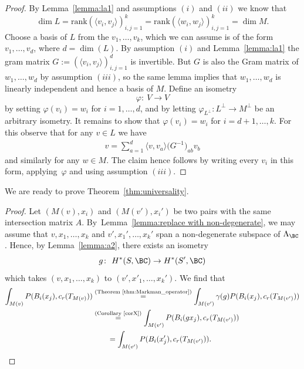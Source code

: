 \begin{proof}
By Lemma~\ref{lemma:la1} and assumptions $(i)$ and $(ii)$ we know that
\[
\dim L = \mathrm{rank} (\langle v_i, v_j \rangle)_{i,j=1}^{k} =
\mathrm{rank} (\langle w_i, w_j \rangle)_{i,j=1}^{k} = \dim M.
\]
Choose a basis of $L$ from the $v_1, \dots, v_k$, which we can assume is of the form $v_1, \dots, v_d$, where $d=\dim(L)$.
By assumption $(i)$ and Lemma~\ref{lemma:la1} the gram matrix $G := (\langle v_i, v_j \rangle )_{i,j=1}^{d}$ is invertible.
But $G$ is also the Gram matrix of $w_1, \dots, w_d$ by assumption $(iii)$,
so the same lemma implies that $w_1, \dots, w_d$ is linearly independent and hence a basis of $M$.
Define an isometry
\[
\varphi \colon\ V \to V
\]
by setting $\varphi(v_i) = w_i$ for $i=1,\dots, d$,
and by letting $\varphi_{L^{\perp}} \colon L^{\perp} \to M^{\perp}$ be an arbitrary isometry.
It remains to show that $\varphi(v_i) = w_i$ for $i=d+1, \dots, k$.
For this observe that for any $v \in L$ we have
\begin{gather*}
v = \sum_{a=1}^{d} \langle v, v_a \rangle \big(G^{-1}\big)_{ab} v_b
\end{gather*}
and similarly for any $w \in M$.
The claim hence follows by writing every $v_i$ in this form, applying~$\varphi$ and using assumption $(iii)$.
\end{proof}

We are ready to prove Theorem~\ref{thm:universality}.
\begin{proof}
Let $(M(v), x_i)$ and $(M(v'), x_i')$ be two pairs with the same intersection matrix $A$.
By~Lemma~\ref{lemma:replace with non-degenerate}, we may assume that $v,x_1, \dots, x_k$ and
$v', x_1', \dots, x_k'$ span a non-degenerate subspace of $\Lambda_{\BC}$.
Hence, by Lemma~\ref{lemma:a2}, there exists an isometry
\[
g \colon\ H^{\ast}(S,\BC) \to H^{\ast}(S', \BC)
\]
which takes $(v, x_1, \dots,x_k)$ to $(v', x'_1, \dots, x_k')$.
We find that
\begin{align*}
\int_{M(v)} P(B_i(x_j), c_r(T_{M(v)}))
& \overset{\textup{(Theorem~\ref{thm:Markman_operator})}}{=} \int_{M(v')} \gamma(g) P(B_i(x_j), c_r(T_{M(v')})) \\
& \overset{\textup{(Corollary~\ref{corX})}}{=}
\int_{M(v')} P( B_i(g x_j), c_r(T_{M(v')})) \\
&\qquad =
\int_{M(v')} P( B_i(x_j'), c_r(T_{M(v')})).\tag*{\qed}
\end{align*}
\renewcommand{\qed}{}
\end{proof}


